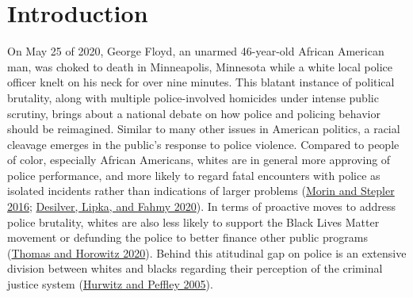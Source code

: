\documentclass[
  12pt,
]{article}
\begin{document}
\ifdefined\Shaded\renewenvironment{Shaded}{\begin{tcolorbox}[sharp corners, enhanced, frame hidden, breakable, boxrule=0pt, interior hidden, borderline west={3pt}{0pt}{shadecolor}]}{\end{tcolorbox}}\fi

\hypertarget{introduction}{%
\section{Introduction}\label{introduction}}

On May 25 of 2020, George Floyd, an unarmed 46-year-old African American
man, was choked to death in Minneapolis, Minnesota while a white local
police officer knelt on his neck for over nine minutes. This blatant
instance of political brutality, along with multiple police-involved
homicides under intense public scrutiny, brings about a national debate
on how police and policing behavior should be reimagined. Similar to
many other issues in American politics, a racial cleavage emerges in the
public's response to police violence. Compared to people of color,
especially African Americans, whites are in general more approving of
police performance, and more likely to regard fatal encounters with
police as isolated incidents rather than indications of larger problems
(\protect\hyperlink{ref-morin2016}{Morin and Stepler 2016};
\protect\hyperlink{ref-desilver}{Desilver, Lipka, and Fahmy 2020}). In
terms of proactive moves to address police brutality, whites are also
less likely to support the Black Lives Matter movement or defunding the
police to better finance other public programs
(\protect\hyperlink{ref-thomas}{Thomas and Horowitz 2020}). Behind this
atitudinal gap on police is an extensive division between whites and
blacks regarding their perception of the criminal justice system
(\protect\hyperlink{ref-hurwitz2005}{Hurwitz and Peffley 2005}).
\end{document}
